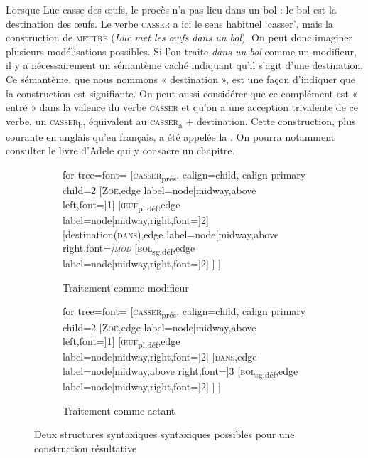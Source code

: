 { Lorsque Luc casse des œufs, le procès n’a pas lieu dans un bol : le bol est la destination des œufs. Le verbe \textsc{casser} a ici le sens habituel ‘casser’, mais la construction de \textsc{mettre} (\textit{Luc met les œufs dans un bol}). On peut donc imaginer plusieurs modélisations possibles. Si l’on traite \textit{dans un bol} comme un modifieur, il y a nécessairement un sémantème caché indiquant qu’il s’agit d’une destination. Ce sémantème, que nous nommons « destination », est une façon d’indiquer que la construction est signifiante. On peut aussi considérer que ce complément est « entré » dans la valence du verbe \textsc{casser} et qu’on a une acception trivalente de ce verbe, un \textsc{casser}\textsubscript{b}, équivalent au \textsc{casser}\textsubscript{a} + destination. Cette construction, plus courante en anglais qu'en français, a été appelée la . On pourra notamment consulter le livre d'Adele \citet{goldberg1995constructions} qui y consacre un chapitre.

\begin{figure}[H]
	\begin{subfigure}[b]{0.5\textwidth}
		\centering
		\begin{forest} for tree={font=\normalfont}
			[\textsc{casser}\textsubscript{prés}, calign=child, calign primary child=2
			[\textsc{Zoé},edge label={node[midway,above left,font=\footnotesize]{1}}]
			[\textsc{œuf}\textsubscript{pl,déf},edge label={node[midway,right,font=\footnotesize]{2}}]
			[destination(\textsc{dans}),edge label={node[midway,above right,font=\footnotesize\itshape]{\textsc{mod}}}
			[\textsc{bol}\textsubscript{sg,déf},edge label={node[midway,right,font=\footnotesize]{2}}]
			]
			]
		\end{forest}
		\caption{Traitement comme modifieur}
	\end{subfigure}%
	\hfill
	\begin{subfigure}[b]{0.5\textwidth}
		\centering
		\begin{forest} for tree={font=\normalfont}
			[\textsc{casser}\textsubscript{prés}, calign=child, calign primary child=2
			[\textsc{Zoé},edge label={node[midway,above left,font=\footnotesize]{1}}]
			[\textsc{œuf}\textsubscript{pl,déf},edge label={node[midway,right,font=\footnotesize]{2}}]
			[\textsc{dans},edge label={node[midway,above right,font=\footnotesize]{3}}
			[\textsc{bol}\textsubscript{sg,déf},edge label={node[midway,right,font=\footnotesize]{2}}]
			]
			]
		\end{forest}
		\caption{Traitement comme actant}
	\end{subfigure}
\caption{Deux structures syntaxiques syntaxiques possibles pour une construction résultative}
\end{figure}

}
